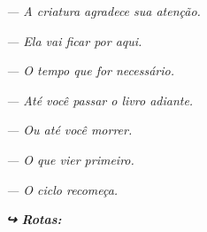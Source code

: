 \noindent \textit{--- A criatura agradece sua atenção.}

\noindent \textit{--- Ela vai ficar por aqui.}

\noindent \textit{--- O tempo que for necessário.}

\noindent \textit{--- Até você passar o livro adiante.}

\noindent \textit{--- Ou até você morrer.}

\noindent \textit{--- O que vier primeiro.}

\noindent \textit{--- O ciclo recomeça.}

\vspace{0.5em}

\noindent\textit{\textbf{↪ Rotas:}  \rotasep {} \rotasep {} \rotasep {}}